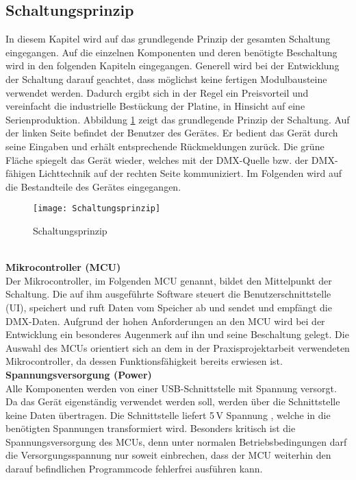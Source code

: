 
\subsection{Schaltungsprinzip}

In diesem Kapitel wird auf das grundlegende Prinzip der gesamten Schaltung eingegangen. Auf die einzelnen Komponenten und deren benötigte Beschaltung wird in den folgenden Kapiteln eingegangen. Generell wird bei der Entwicklung der Schaltung darauf geachtet, dass möglichst keine fertigen Modulbausteine verwendet werden. Dadurch ergibt sich in der Regel ein Preisvorteil und vereinfacht die industrielle Bestückung der Platine, in Hinsicht auf eine Serienproduktion. %
Abbildung \ref{fig:Schaltungsrinzip} zeigt das grundlegende Prinzip der Schaltung. Auf der linken Seite befindet der Benutzer des Gerätes. Er bedient das Gerät durch seine Eingaben und erhält entsprechende Rückmeldungen zurück. Die grüne Fläche spiegelt das Gerät wieder, welches mit der DMX-Quelle bzw. der DMX-fähigen Lichttechnik auf der rechten Seite kommuniziert. Im Folgenden wird auf die Bestandteile des Gerätes eingegangen.
\begin{figure}[h]
	\texttt{[image: Schaltungsprinzip]}
	\caption{Schaltungsprinzip}
	\label{fig:Schaltungsrinzip}
\end{figure}\\
\textbf{Mikrocontroller (MCU)}\\
Der Mikrocontroller, im Folgenden MCU genannt, bildet den Mittelpunkt der Schaltung. Die auf ihm ausgeführte Software steuert die Benutzerschnittstelle (UI), speichert und ruft Daten vom Speicher ab und sendet und empfängt die DMX-Daten. Aufgrund der hohen Anforderungen an den MCU wird bei der Entwicklung ein besonderes Augenmerk auf ihn und seine Beschaltung gelegt. Die Auswahl des MCUs orientiert sich an dem in der Praxisprojektarbeit verwendeten Mikrocontroller, da dessen Funktionsfähigkeit bereits erwiesen ist.\\
\newline
\textbf{Spannungsversorgung (Power)}\\
Alle Komponenten werden von einer USB-Schnittstelle mit Spannung versorgt. Da das Gerät eigenständig verwendet werden soll, werden über die Schnittstelle keine Daten übertragen. Die Schnittstelle liefert 5\,V Spannung \cite[S. 44]{USB-Battery}, welche in die benötigten Spannungen transformiert wird. Besonders kritisch ist die Spannungsversorgung des MCUs, denn unter normalen Betriebsbedingungen darf die Versorgungsspannung nur soweit einbrechen, dass der MCU weiterhin den darauf befindlichen Programmcode fehlerfrei ausführen kann.\\
